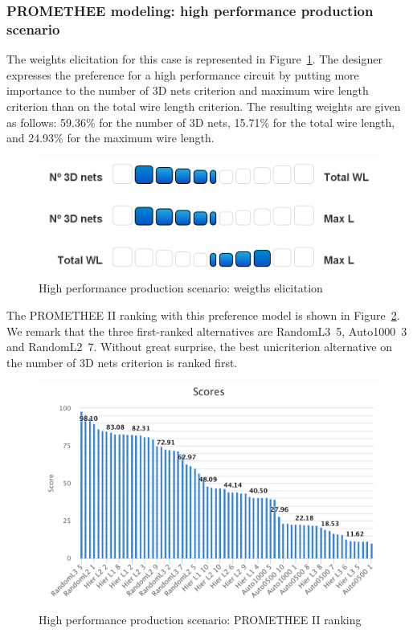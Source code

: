 \documentclass{svmult}
\begin{document}
\subsubsection{PROMETHEE modeling: high performance production scenario}
The weights elicitation for this case is represented in Figure~\ref{fig:elicitperf}. The designer expresses the preference for a high performance circuit by putting more importance to the number of 3D nets criterion and maximum wire length criterion than on the total wire length criterion. The resulting weights are given as follows: 59.36\% for the number of 3D nets, 15.71\% for the total wire length, and 24.93\% for the maximum wire length.

\begin{figure}[h!]
    \centering
    \includegraphics[width=0.62\linewidth]{elicitperf.png}
    \caption{High performance production scenario: weigths elicitation}
    \label{fig:elicitperf}
\end{figure}

The PROMETHEE II ranking with this preference model is shown in Figure~\ref{fig:rankingperf}. We remark that the three first-ranked alternatives are RandomL3~5, Auto1000~3 and RandomL2~7. Without great surprise, the best unicriterion alternative on the number of 3D nets criterion is ranked first.

\begin{figure}[h!]
    \centering
    \includegraphics[width=\linewidth]{rankingperf}
    \caption{High performance production scenario: PROMETHEE II ranking}
    \label{fig:rankingperf}
\end{figure}
\end{document}
